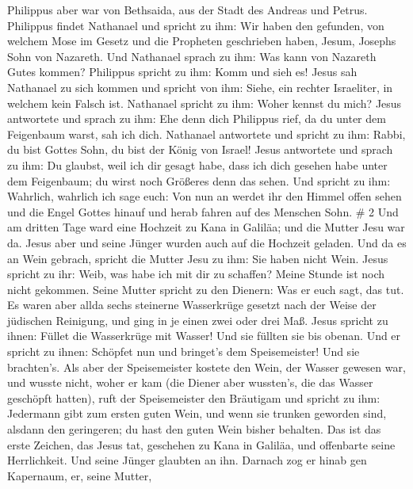  Philippus aber war von Bethsaida, aus der Stadt des
Andreas und Petrus.  Philippus findet Nathanael und spricht
zu ihm: Wir haben den gefunden, von welchem Mose im Gesetz und die
Propheten geschrieben haben, Jesum, Josephs Sohn von Nazareth.
 Und Nathanael sprach zu ihm: Was kann von Nazareth Gutes
kommen? Philippus spricht zu ihm: Komm und sieh es!  Jesus
sah Nathanael zu sich kommen und spricht von ihm: Siehe, ein rechter
Israeliter, in welchem kein Falsch ist.  Nathanael spricht
zu ihm: Woher kennst du mich? Jesus antwortete und sprach zu ihm: Ehe
denn dich Philippus rief, da du unter dem Feigenbaum warst, sah ich
dich.  Nathanael antwortete und spricht zu ihm: Rabbi, du
bist Gottes Sohn, du bist der König von Israel!  Jesus
antwortete und sprach zu ihm: Du glaubst, weil ich dir gesagt habe, dass
ich dich gesehen habe unter dem Feigenbaum; du wirst noch Größeres denn
das sehen.  Und spricht zu ihm: Wahrlich, wahrlich ich sage
euch: Von nun an werdet ihr den Himmel offen sehen und die Engel Gottes
hinauf und herab fahren auf des Menschen Sohn. \# 2  Und am
dritten Tage ward eine Hochzeit zu Kana in Galiläa; und die Mutter Jesu
war da.  Jesus aber und seine Jünger wurden auch auf die
Hochzeit geladen.  Und da es an Wein gebrach, spricht die
Mutter Jesu zu ihm: Sie haben nicht Wein.  Jesus spricht zu
ihr: Weib, was habe ich mit dir zu schaffen? Meine Stunde ist noch nicht
gekommen.  Seine Mutter spricht zu den Dienern: Was er euch
sagt, das tut.  Es waren aber allda sechs steinerne
Wasserkrüge gesetzt nach der Weise der jüdischen Reinigung, und ging in
je einen zwei oder drei Maß.  Jesus spricht zu ihnen: Füllet
die Wasserkrüge mit Wasser! Und sie füllten sie bis obenan. 
Und er spricht zu ihnen: Schöpfet nun und bringet's dem Speisemeister!
Und sie brachten's.  Als aber der Speisemeister kostete den
Wein, der Wasser gewesen war, und wusste nicht, woher er kam (die Diener
aber wussten's, die das Wasser geschöpft hatten), ruft der Speisemeister
den Bräutigam  und spricht zu ihm: Jedermann gibt zum
ersten guten Wein, und wenn sie trunken geworden sind, alsdann den
geringeren; du hast den guten Wein bisher behalten.  Das
ist das erste Zeichen, das Jesus tat, geschehen zu Kana in Galiläa, und
offenbarte seine Herrlichkeit. Und seine Jünger glaubten an ihn.
 Darnach zog er hinab gen Kapernaum, er, seine Mutter,
